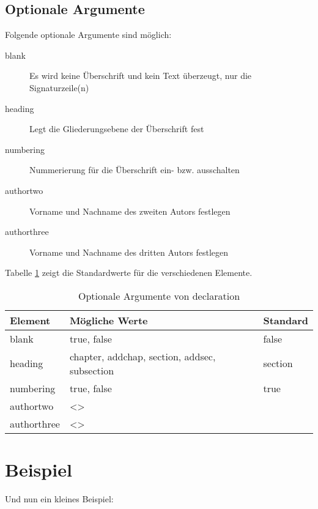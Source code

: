 \documentclass[%
	fontsize=10pt, 
	DIV=8, 
]{scrartcl}
\begin{document}
	\subsection{Optionale Argumente}
	Folgende optionale Argumente sind möglich:
	\begin{description}
		\item[blank] Es wird keine Überschrift und kein Text überzeugt, nur die Signaturzeile(n)
		\item[heading] Legt die Gliederungsebene der Überschrift fest
		\item[numbering] Nummerierung für die Überschrift ein- bzw. ausschalten
		\item[authortwo] Vorname und Nachname des zweiten Autors festlegen
		\item[authorthree] Vorname und Nachname des dritten Autors festlegen
	\end{description}
	
	Tabelle \ref{tab:1} zeigt die Standardwerte für die verschiedenen Elemente.
	
	\begin{table}
		\centering
		\begin{tabular}{lll}\toprule
			Element		&	Mögliche Werte	&	Standard\\\midrule
			blank		&	true, false		&	false\\
			heading		&	chapter, addchap, section, addsec, subsection	&	section\\
			numbering	&	true, false	&	true\\
			authortwo	&	<>		&	\\
			authorthree	&	<>		&	\\\bottomrule
		\end{tabular}
		\caption{Optionale Argumente von declaration}
		\label{tab:1}
	\end{table}		
	
\newpage
	
\section{Beispiel}
Und nun ein kleines Beispiel:
	
\end{document}
